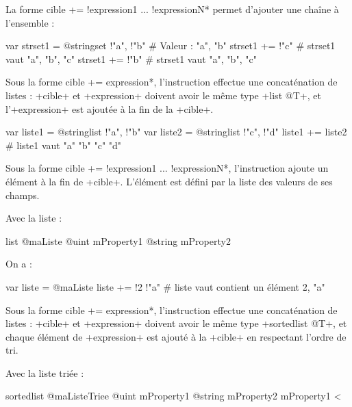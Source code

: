 La forme \ggs*cible += !expression1 ... !expressionN* permet d'ajouter une chaîne à l'ensemble :
\begin{galgas}
var strset1 = @stringset {!"a", !"b"} # Valeur : "a", "b"
strset1 += !"c" # strset1 vaut "a", "b", "c"
strset1 += !"b" # strset1 vaut "a", "b", "c"
\end{galgas}




Sous la forme \ggs*cible += expression*, l'instruction effectue une concaténation de listes : \ggs+cible+ et \ggs+expression+ doivent avoir le même type \ggs+list @T+, et l'\ggs+expression+ est ajoutée à la fin de la \ggs+cible+.

\begin{galgas}
var liste1 = @stringlist {!"a", !"b"}
var liste2 = @stringlist {!"c", !"d"}
liste1 += liste2 # liste1 vaut "a" "b" "c" "d"
\end{galgas}



Sous la forme \ggs*cible += !expression1 ... !expressionN*, l'instruction ajoute un élément à la fin de \ggs+cible+. L'élément est défini par la liste des valeurs de ses champs.

Avec la liste :
\begin{galgas}
list @maListe {
  @uint mProperty1
  @string mProperty2
}
\end{galgas}

On a :

\begin{galgas}
var liste = @maListe {}
liste += !2 !"a" # liste vaut contient un élément 2, "a"
\end{galgas}







Sous la forme \ggs*cible += expression*, l'instruction effectue une concaténation de listes : \ggs+cible+ et \ggs+expression+ doivent avoir le même type \ggs+sortedlist @T+, et chaque élément de \ggs+expression+ est ajouté à la \ggs+cible+ en respectant l'ordre de tri.

Avec la liste triée :
\begin{galgas}
sortedlist @maListeTriee {
  @uint mProperty1
  @string mProperty2
}{
  mProperty1 <
}
\end{galgas}

